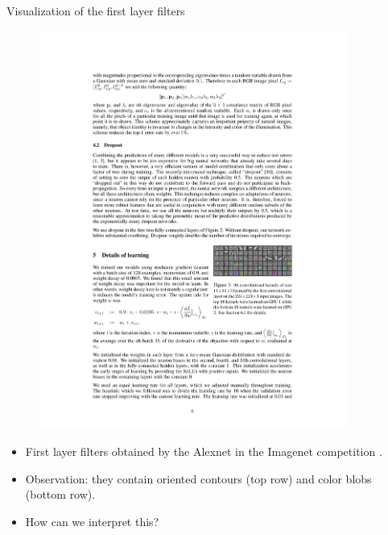 \documentclass[xcolor=pdftex,dvipsnames,table]{beamer}
\begin{document}
\begin{frame}{Visualization of the first layer filters}
\begin{figure}[htb]
\includegraphics[width=0.9\textwidth]{../graphics/Vis_filter_imagenet.pdf}
\end{figure}
\begin{itemize}
	\item First layer filters obtained by the Alexnet in the Imagenet competition \cite{Krizhevsky:2012}. 
	\item Observation: they contain oriented contours (top row) and color blobs (bottom row). 
	\item How can we interpret this? 
\end{itemize}
\end{frame}
\end{document}
